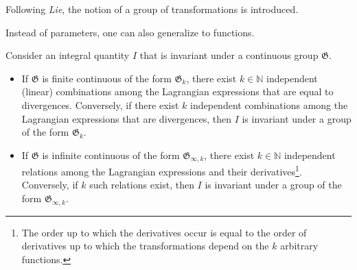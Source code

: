     Following \textit{Lie}, the notion of a group of transformations is introduced.

    Instead of parameters, one can also generalize to functions.

    \begin{theorem}[Noether]\label{var:noether}
        Consider an integral quantity $I$ that is invariant under a continuous group $\mathfrak{G}$.
        \begin{itemize}
            \item If $\mathfrak{G}$ is finite continuous of the form $\mathfrak{G}_k$, there exist $k\in\mathbb{N}$ independent (linear) combinations among the Lagrangian expressions that are equal to divergences. Conversely, if there exist $k$ independent combinations among the Lagrangian expressions that are divergences, then $I$ is invariant under a group of the form $\mathfrak{G}_k$.
            \item If $\mathfrak{G}$ is infinite continuous of the form $\mathfrak{G}_{\infty,k}$, there exist $k\in\mathbb{N}$ independent relations among the Lagrangian expressions and their derivatives\footnote{The order up to which the derivatives occur is equal to the order of derivatives up to which the transformations depend on the $k$ arbitrary functions.}. Conversely, if $k$ such relations exist, then $I$ is invariant under a group of the form $\mathfrak{G}_{\infty,k}$.
        \end{itemize}
    \end{theorem}

